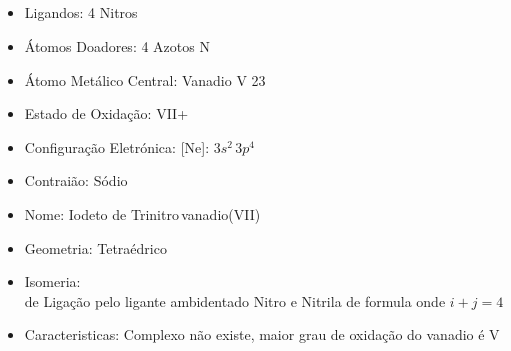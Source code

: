\documentclass[12pt]{article}
\begin{document}
	\subsection{}
	\begin{itemize}
   
   
   \item Ligandos: 4 Nitros 
   
   
   \item Átomos Doadores: 4 Azotos N
   
   \item Átomo Metálico Central: Vanadio V 23
   
   \item Estado de Oxidação: VII+
   
   \item Configuração Eletrónica: 
   	[Ne]: $ 3s^2\,3p^4 $
   
   \item Contraião: Sódio 
   
   \item Nome: Iodeto de Trinitro\,vanadio(VII)
   
   \item Geometria: Tetraédrico
   
   \item Isomeria:\\
   	de Ligação pelo ligante ambidentado Nitro  e Nitrila  de formula  onde $i+j=4$

	\item Caracteristicas: Complexo não existe, maior grau de oxidação do vanadio é V

	\end{itemize}
	
\break


\end{document}

